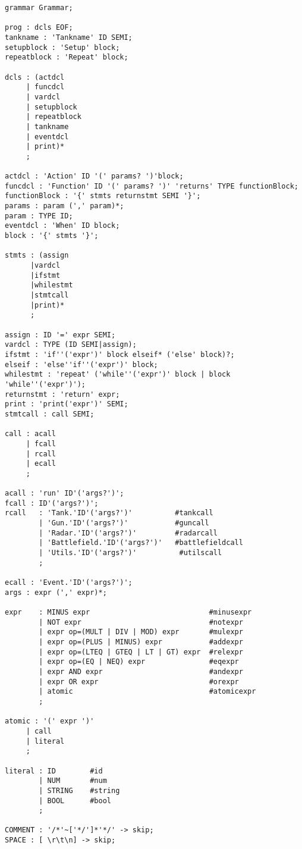 \begin{lstlisting}[label={lst:CFG}]
grammar Grammar;

prog : dcls EOF;
tankname : 'Tankname' ID SEMI;
setupblock : 'Setup' block;
repeatblock : 'Repeat' block;

dcls : (actdcl
     | funcdcl
     | vardcl
     | setupblock
     | repeatblock
     | tankname
     | eventdcl
     | print)*
     ;

actdcl : 'Action' ID '(' params? ')'block;
funcdcl : 'Function' ID '(' params? ')' 'returns' TYPE functionBlock;
functionBlock : '{' stmts returnstmt SEMI '}';
params : param (',' param)*;
param : TYPE ID;
eventdcl : 'When' ID block;
block : '{' stmts '}';

stmts : (assign
      |vardcl
      |ifstmt
      |whilestmt
      |stmtcall
      |print)*
      ;

assign : ID '=' expr SEMI;
vardcl : TYPE (ID SEMI|assign);
ifstmt : 'if''('expr')' block elseif* ('else' block)?;
elseif : 'else''if''('expr')' block;
whilestmt : 'repeat' ('while''('expr')' block | block 'while''('expr')');
returnstmt : 'return' expr;
print : 'print('expr')' SEMI;
stmtcall : call SEMI;

call : acall
     | fcall
     | rcall
     | ecall
     ;

acall : 'run' ID'('args?')';
fcall : ID'('args?')';
rcall   : 'Tank.'ID'('args?')'          #tankcall
        | 'Gun.'ID'('args?')'           #guncall
        | 'Radar.'ID'('args?')'         #radarcall
        | 'Battlefield.'ID'('args?')'   #battlefieldcall
        | 'Utils.'ID'('args?')'          #utilscall
        ;
        
ecall : 'Event.'ID'('args?')';
args : expr (',' expr)*;

expr    : MINUS expr                            #minusexpr
        | NOT expr                              #notexpr
        | expr op=(MULT | DIV | MOD) expr       #mulexpr
        | expr op=(PLUS | MINUS) expr           #addexpr
        | expr op=(LTEQ | GTEQ | LT | GT) expr  #relexpr
        | expr op=(EQ | NEQ) expr               #eqexpr
        | expr AND expr                         #andexpr
        | expr OR expr                          #orexpr
        | atomic                                #atomicexpr
        ;

atomic : '(' expr ')'
     | call
     | literal
     ;

literal : ID        #id
        | NUM       #num
        | STRING    #string
        | BOOL      #bool
        ;

COMMENT : '/*'~['*/']*'*/' -> skip;
SPACE : [ \r\t\n] -> skip;
\end{lstlisting}

